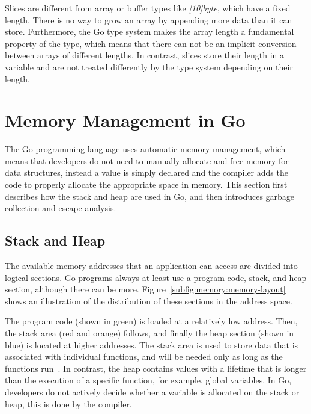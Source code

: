 Slices are different from array or buffer types like \textit{[10]byte}, which have a fixed length.
There is no way to grow an array by appending more data than it can store.
Furthermore, the Go type system makes the array length a fundamental property of the type, which means that there can
not be an implicit conversion between arrays of different lengths.
In contrast, slices store their length in a variable and are not treated differently by the type system depending on
their length.



\section{Memory Management in Go}\label{sec:background:memory}

The Go programming language uses automatic memory management, which means that developers do not need to manually
allocate and free memory for data structures, instead a value is simply declared and the compiler adds the code to
properly allocate the appropriate space in memory.
This section first describes how the stack and heap are used in Go, and then introduces garbage collection and escape
analysis.



\subsection{Stack and Heap}\label{subsec:background:memory:stack-heap}

The available memory addresses that an application can access are divided into logical sections.
Go programs always at least use a program code, stack, and heap section, although there can be more.
Figure~\ref{subfig:memory:memory-layout} shows an illustration of the distribution of these sections in the address
space.



The program code (shown in green) is loaded at a relatively low address.
Then, the stack area (red and orange) follows, and finally the heap section (shown in blue) is located at higher
addresses.
The stack area is used to store data that is associated with individual functions, and will be needed only as long as
the functions run~\cite{ferres2010}.
In contrast, the heap contains values with a lifetime that is longer than the execution of a specific function, for
example, global variables.
In Go, developers do not actively decide whether a variable is allocated on the stack or heap, this is done by the
compiler.

